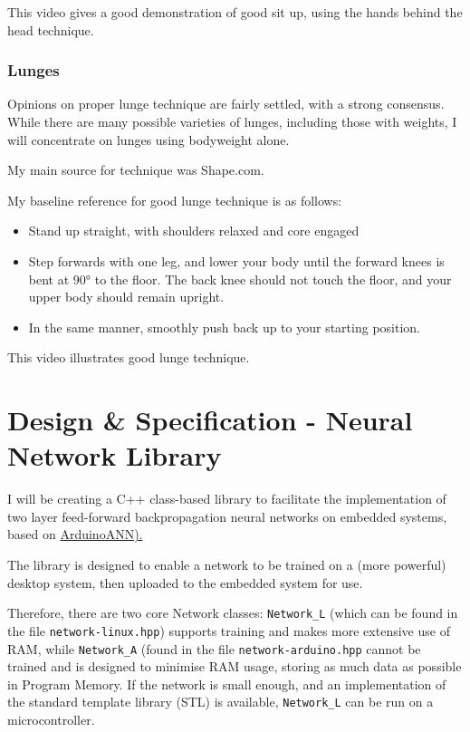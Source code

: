 \documentclass[a4paper]{article}
\begin{document}
This video\cite{bgref23} gives a good demonstration of good sit up, using the hands behind the head technique.

\subsubsection{Lunges}

Opinions on proper lunge technique are fairly settled, with a strong consensus. While there are many possible varieties of lunges, including those with weights, I will concentrate on lunges using bodyweight alone.

My main source for technique was Shape.com\cite{bgref24}.

My baseline reference for good lunge technique is as follows:

\begin{itemize}
    \item Stand up straight, with shoulders relaxed and core engaged
    \item Step forwards with one leg, and lower your body until the forward knees is bent at 90° to the floor. The back knee should not touch the floor, and your upper body should remain upright.
    \item In the same manner, smoothly push back up to your starting position.
\end{itemize}

This video\cite{bgref25} illustrates good lunge technique.

\newpage
\section{Design \& Specification - Neural Network Library}
\label{sec:dn}

I will be creating a C++ class-based library to facilitate the implementation of two layer feed-forward backpropagation neural networks on embedded systems, based on \hyperref[subsec:bg_arduinoann]{ArduinoANN).}

The library is designed to enable a network to be trained on a (more powerful) desktop system, then uploaded to the embedded system for use.

Therefore, there are two core Network classes: \lstinline{Network_L} (which can be found in the file \lstinline{network-linux.hpp}) supports training and makes more extensive use of RAM, while \lstinline{Network_A} (found in the file \lstinline{network-arduino.hpp} cannot be trained and is designed to minimise RAM usage, storing as much data as possible in Program Memory. If the network is small enough, and an implementation of the standard template library (STL) is available, \lstinline{Network_L} can be run on a microcontroller.
\end{document}
